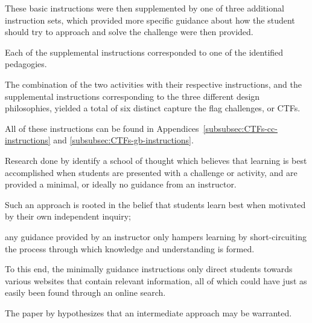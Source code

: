 These basic instructions were then supplemented by one of three additional instruction sets, which provided more specific guidance about how the student should try to approach and solve the challenge were then provided. %



Each of the supplemental instructions corresponded to one of the identified pedagogies. %



The combination of the two activities with their respective instructions, and the supplemental instructions corresponding to the three different design philosophies, yielded a total of six distinct capture the flag challenges, or CTFs. %



All of these instructions can be found in Appendices~\ref{subsubsec:CTFs-cc-instructions} and \ref{subsubsec:CTFs-gb-instructions}.










        Research done by \textcite{J-Sweller,R-Weiss} identify a school of thought which believes that learning is best accomplished when students are presented with a challenge or activity, and are provided a minimal, or ideally no guidance from an instructor. %



Such an approach is rooted in the belief that students learn best when motivated by their own independent inquiry; %



any guidance provided by an instructor only hampers learning by short-circuiting the process through which knowledge and understanding is formed. 







        To this end, the minimally guidance instructions only direct students towards various websites that contain relevant information, all of which could have just as easily been found through an online search. 










        The paper by \textcite{R-Weiss} hypothesizes that an intermediate approach may be warranted. %



